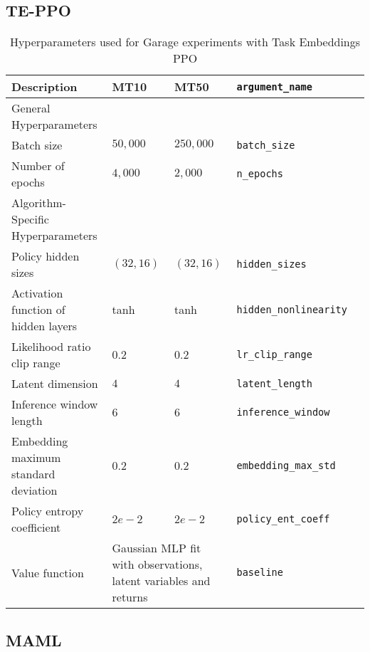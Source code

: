 \FloatBarrier


\clearpage
\subsection{TE-PPO}

\FloatBarrier

\begin{table}[h!]
\begin{tabularx}{\linewidth}{ l X X X l }
    \toprule
    \textbf{Description} & \textbf{MT10} & \textbf{MT50} & \texttt{argument\_name} \\
    \midrule
    General Hyperparameters \\
    \midrule
    Batch size & $50{,}000$ & $250{,}000$ & \texttt{batch\_size} \\
    Number of epochs & $4{,}000$ & $2{,}000$ & \texttt{n\_epochs} \\
    \midrule
    Algorithm-Specific Hyperparameters \\
    \midrule
    Policy hidden sizes & $(32, 16)$ & $(32, 16)$ & \texttt{hidden\_sizes} \\
    Activation function of hidden layers & tanh & tanh & \texttt{hidden\_nonlinearity} \\
    Likelihood ratio clip range & $0.2$ & $0.2$ & \texttt{lr\_clip\_range} \\
    Latent dimension & $4$ & $4$ & \texttt{latent\_length} \\
    Inference window length & $6$ & $6$ & \texttt{inference\_window} \\ 
    Embedding maximum standard deviation & $0.2$ & $0.2$ & \texttt{embedding\_max\_std} \\
    Policy entropy coefficient & $2e-2$ & $2e-2$ & \texttt{policy\_ent\_coeff} \\
    Value function & \multicolumn{2}{L{4.2cm}}{Gaussian MLP fit with observations, latent variables and returns} & \texttt{baseline} \\
    \bottomrule
\end{tabularx}
\caption{Hyperparameters used for Garage experiments with Task Embeddings PPO}
\label{tab:garage_te_hparams}
\end{table}

\FloatBarrier

\clearpage

\subsection{MAML}

